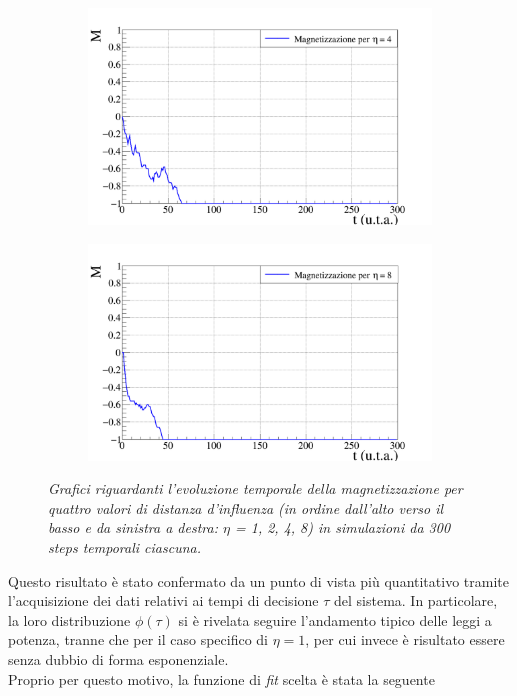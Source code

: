 \documentclass[letterpaper,10pt]{article}
\begin{document}
\begin{figure}
\ContinuedFloat
\centering
\begin{subfigure}{0.95\textwidth}
\includegraphics[width=\linewidth]{partial_magn_graph_v4.png}
\end{subfigure}
\begin{subfigure}{0.95\textwidth}
\includegraphics[width=\linewidth]{partial_magn_graph_v8.png}
\end{subfigure}
\caption{\textit{Grafici riguardanti l'evoluzione temporale della magnetizzazione per quattro valori di distanza d'influenza (in ordine dall'alto verso il basso e da sinistra a destra: $\eta$ = 1, 2, 4, 8) in simulazioni da 300 steps temporali ciascuna.}}
\label{Fig:14}
\end{figure}

\bigskip  \bigskip  \bigskip  
Questo risultato è stato confermato da un punto di vista più quantitativo tramite l'acquisizione dei dati relativi ai tempi di decisione $\tau$ del sistema. In particolare, la loro distribuzione $\phi(\tau)$ si è rivelata seguire l'andamento tipico delle leggi a potenza, tranne che per il caso specifico di $\eta = 1$, per cui invece è risultato essere senza dubbio di forma esponenziale.
\\ Proprio per questo motivo, la funzione di \textit{fit} scelta è stata la seguente
\end{document}
